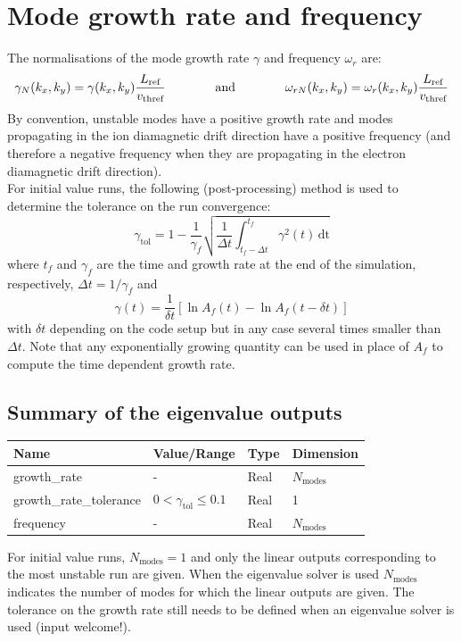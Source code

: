 \documentclass[fleqn]{report}
\begin{document}
\section{Mode growth rate and frequency}
The normalisations of the mode growth rate $\gamma$ and frequency $\omega_r$ are:
\begin{equation}
 \gamma_N(k_x,k_y) = \gamma(k_x,k_y) \frac{L_{\textrm{ref}}}{v_\textrm{thref}} \qquad \qquad \textrm{and} \qquad \qquad \omega_{rN}(k_x,k_y) = \omega_r(k_x,k_y) \frac{L_{\textrm{ref}}}{v_\textrm{thref}}
\end{equation}
By convention, unstable modes have a positive growth rate and modes propagating in the ion diamagnetic drift direction have a positive frequency (and therefore a negative frequency when they are propagating in the electron diamagnetic drift direction).\\

For initial value runs, the following (post-processing) method is used to determine the tolerance on the run convergence:
$$\gamma_\textrm{tol} = 1-\frac{1}{\gamma_f}\sqrt{\frac{1}{\Delta t}\int_{t_f-\Delta t}^{t_f} \gamma^2(t)\,\textrm{dt}}$$
where $t_f$ and $\gamma_f$ are the time and growth rate at the end of the simulation, respectively, $\Delta t = 1/\gamma_f$ and
$$\gamma(t)=\frac{1}{\delta t}[\ln{A_f(t)}-\ln{A_f(t-\delta t)}]$$
with $\delta t$ depending on the code setup but in any case several times smaller than $\Delta t$. Note that any exponentially growing quantity can be used in place of $A_f$ to compute the time dependent growth rate.

\subsection{Summary of the eigenvalue outputs}
\begin{tabularx}{\textwidth}{|X|Y|Y|Y|}
\hline
Name & Value/Range & Type & Dimension \\
\hline
growth\_rate & - & Real & $N_\textrm{modes}$ \\
growth\_rate\_tolerance & $0<\gamma_\textrm{tol}\leq 0.1$ & Real & 1 \\
frequency & - & Real & $N_\textrm{modes}$ \\
\hline
\end{tabularx}
For initial value runs, $N_\textrm{modes}=1$ and only the linear outputs corresponding to the most unstable run are given. When the eigenvalue solver is used $N_\textrm{modes}$ indicates the number of modes for which the linear outputs are given. The tolerance on the growth rate still needs to be defined when an eigenvalue solver is used (input welcome!).
\end{document}
